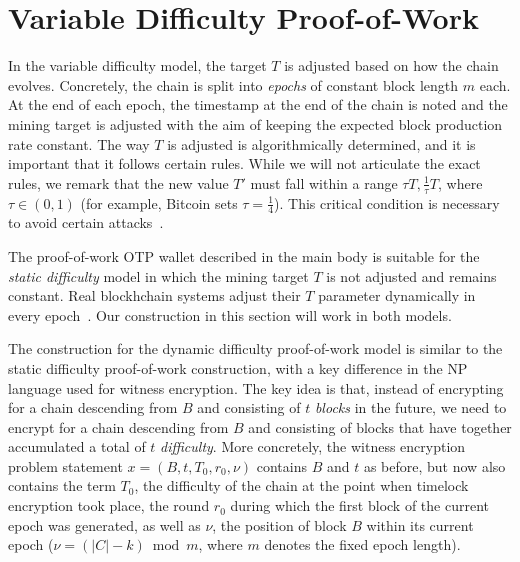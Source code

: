 \section{Variable Difficulty Proof-of-Work}

In the variable difficulty model, the target $T$ is adjusted based on how the chain evolves.
Concretely, the chain is split into \emph{epochs} of constant block length $m$ each. At the end of each
epoch, the timestamp at the end of the chain is noted and the mining target is adjusted with the
aim of keeping the expected block production rate constant.
The
way $T$ is adjusted is algorithmically determined, and it is important that it follows certain
rules. While we will not articulate the exact rules, we remark that the new value $T'$ must fall
within a range $\tau T, \frac{1}{\tau} T$, where $\tau \in (0, 1)$ (for example, Bitcoin sets
$\tau = \frac{1}{4}$). This critical condition is necessary to avoid certain attacks~\cite{bahack}.

The proof-of-work OTP wallet described in the main body is suitable for the
\emph{static difficulty}
model in which the mining target $T$ is not adjusted and remains constant.
Real blockhchain systems adjust their $T$ parameter dynamically in every
epoch~\cite{varbackbone}. Our construction in
this section will work in both models.

The construction for the dynamic difficulty proof-of-work model is similar
to the static difficulty proof-of-work construction, with a key difference
in the \textsc{NP} language used for witness encryption. The key idea is
that, instead of encrypting for a chain descending from $B$ and consisting
of $t$ \emph{blocks} in the future, we need to encrypt for a chain descending
from $B$ and consisting of blocks that have together accumulated a total of $t$
\emph{difficulty}. More concretely, the witness encryption problem statement
$x = (B, t, T_0, r_0, \nu)$ contains $B$ and $t$ as before, but now also contains the
term $T_0$, the difficulty of the chain at the point when timelock encryption
took place, the round $r_0$ during which the first block of the current epoch was
generated, as well as $\nu$, the position of block $B$ within its current epoch
($\nu = (|C| - k) \bmod m$, where $m$ denotes the fixed epoch length).

